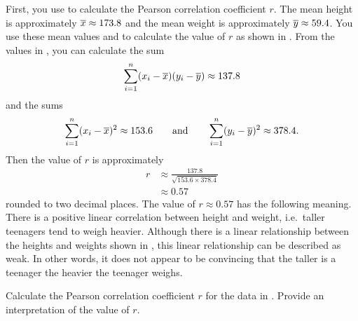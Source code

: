 \documentclass[a4paper,oneside,12pt]{article}
\begin{document}
\begin{solution}
First, you use  to
calculate the Pearson correlation coefficient $r$.  The mean height is
approximately $\overline{x} \approx 173.8$ and the mean weight is
approximately $\overline{y} \approx 59.4$.  You use these mean values and
 to calculate the
value of $r$ as shown in .  From
the values in , you can calculate
the sum
\[
\sum_{i=1}^n (x_i - \overline{x}) (y_i - \overline{y})
\approx
137.8
\]
and the sums
\[
\sum_{i=1}^n (x_i - \overline{x})^2
\approx
153.6
\qquad
\text{and}
\qquad
\sum_{i=1}^n (y_i - \overline{y})^2
\approx
378.4.
\]
Then the value of $r$ is approximately
\begin{align*}
r
&\approx
\frac{137.8}{\sqrt{153.6 \times 378.4}} \\[4pt]
&\approx
0.57
\end{align*}
rounded to two decimal places.  The value of $r \approx 0.57$ has the
following meaning.  There is a positive linear correlation between
height and weight, i.e.~taller teenagers tend to weigh heavier.
Although there is a linear relationship between the heights and
weights shown in , this linear relationship
can be described as weak.  In other words, it does not appear to be
convincing that the taller is a teenager the heavier the teenager
weighs.
\end{solution}

\begin{exercise}
Calculate the Pearson correlation coefficient $r$ for the data in
.  Provide an interpretation of the value of
$r$.
\end{exercise}
\end{document}
